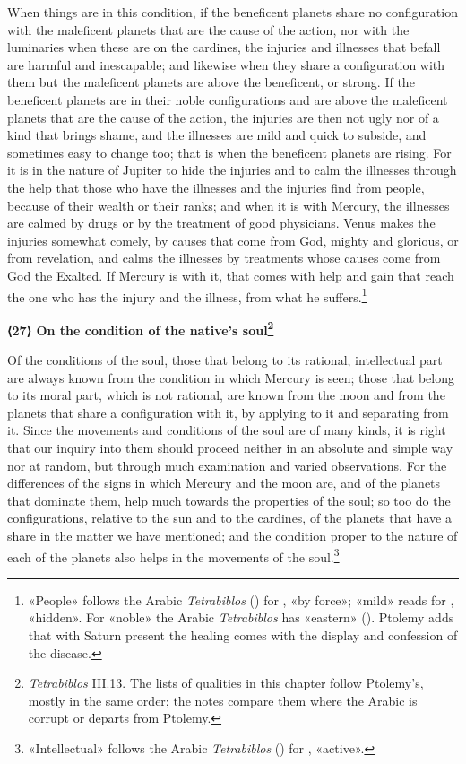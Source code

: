 \documentclass[11pt]{article}
\newcommand{\Fol}[1]{\marginpar{\footnotesize\color{gray}f.\,#1}}
\newcommand{\ChapterHead}[4]{\par\needspace{8\baselineskip}\bigskip\pdfbookmark[1]{#1}{ch-#2}\hypertarget{EN-K#2}{}%
 {\large\bfseries\interlinepenalty=10000 #1#4{\normalfont\normalsize#3}\par}\nobreak\medskip}
\begin{document}
\par \Fol{55r}When things are in this condition, if the beneficent planets share no configuration with the maleficent planets that are the cause of the action, nor with the luminaries when these are on the cardines, the injuries and illnesses that befall are harmful and inescapable; and likewise when they share a configuration with them but the maleficent planets are above the beneficent, or strong. If the beneficent planets are in their noble configurations and are above the maleficent planets that are the cause of the action, the injuries are then not ugly nor of a kind that brings shame, and the illnesses are mild and quick to subside, and sometimes easy to change too; that is when the beneficent planets are rising. For it is in the nature of Jupiter to hide the injuries and to calm the illnesses through the help that those who have the illnesses and the injuries find from people, because of their wealth or their ranks; and when it is with Mercury, the illnesses are calmed by drugs or by the treatment of good physicians. Venus makes the injuries somewhat comely, by causes that come from God, mighty and glorious, or from revelation, and calms the illnesses by treatments whose causes come from God the Exalted. If Mercury is with it, that comes with help and gain that reach the one who has the injury and the illness, from what he suffers.\footnote{«People» follows the Arabic \emph{Tetrabiblos} () for , «by force»; «mild» reads  for , «hidden». For «noble» the Arabic \emph{Tetrabiblos} has «eastern» (). Ptolemy adds that with Saturn present the healing comes with the display and confession of the disease.}\par
\ChapterHead{{\mdseries ⟨}27{\mdseries ⟩} On the condition of the native's soul}{27}{}{\footnote{\emph{Tetrabiblos} III.13. The lists of qualities in this chapter follow Ptolemy's, mostly in the same order; the notes compare them where the Arabic is corrupt or departs from Ptolemy.}}
\par Of the conditions of the soul, those that belong to its rational, intellectual part are always known from the condition in which Mercury is seen; those that belong to its moral part, which is not rational, are known from the moon and from the planets that share a configuration with it, by applying to it and separating from it. Since the movements and conditions of the soul are of many kinds, it is right that our inquiry into them should proceed neither in an absolute and simple way nor at random, but through much examination and varied observations. For the differences of the signs in which Mercury and the moon are, and of the planets that dominate them, help much towards the properties of the soul; so too do the configurations, relative to the sun and to the cardines, of the planets that have a share in the matter we have mentioned; and the condition proper to the nature of each of the planets also helps in the movements of the soul.\footnote{«Intellectual» follows the Arabic \emph{Tetrabiblos} () for , «active».}\par
\end{document}
